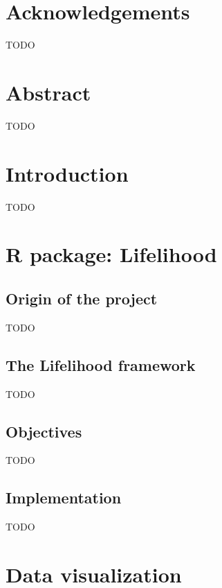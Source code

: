 \documentclass[
]{article}
\begin{document}
\newpage

\section{Acknowledgements}\label{acknowledgements}

TODO

\newpage

\section{Abstract}\label{abstract}

TODO

\newpage

\section{Introduction}\label{introduction}

TODO

\newpage

\section{R package: Lifelihood}\label{r-package-lifelihood}

\subsection{Origin of the project}\label{origin-of-the-project}

TODO

\subsection{The Lifelihood framework}\label{the-lifelihood-framework}

TODO

\subsection{Objectives}\label{objectives}

TODO

\subsection{Implementation}\label{implementation}

TODO

\newpage

\section{Data visualization}\label{data-visualization}
\end{document}
